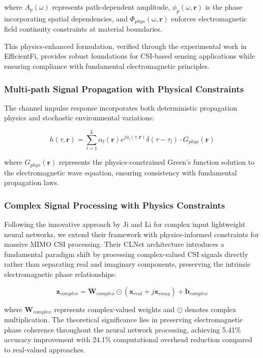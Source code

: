 \documentclass[journal]{IEEEtran}
\begin{document}
where $A_p(\omega)$ represents path-dependent amplitude, $\phi_p(\omega,\mathbf{r})$ is the phase incorporating spatial dependencies, and $\Phi_{phys}(\omega,\mathbf{r})$ enforces electromagnetic field continuity constraints at material boundaries.

This physics-enhanced formulation, verified through the experimental work in EfficientFi, provides robust foundations for CSI-based sensing applications while ensuring compliance with fundamental electromagnetic principles.

\subsubsection{Multi-path Signal Propagation with Physical Constraints}

The channel impulse response incorporates both deterministic propagation physics and stochastic environmental variations:

\begin{equation}
h(\tau,\mathbf{r}) = \sum_{l=1}^{L} \alpha_l(\mathbf{r}) e^{j\phi_l(\tau,\mathbf{r})} \delta(\tau - \tau_l) \cdot G_{phys}(\mathbf{r})
\label{eq:cir_physics}
\end{equation}

where $G_{phys}(\mathbf{r})$ represents the physics-constrained Green's function solution to the electromagnetic wave equation, ensuring consistency with fundamental propagation laws.

\subsubsection{Complex Signal Processing with Physics Constraints}

Following the innovative approach by Ji and Li \cite{ji2021clnet} for complex input lightweight neural networks, we extend their framework with physics-informed constraints for massive MIMO CSI processing. Their CLNet architecture introduces a fundamental paradigm shift by processing complex-valued CSI signals directly rather than separating real and imaginary components, preserving the intrinsic electromagnetic phase relationships:

\begin{equation}
\mathbf{z}_{complex} = \mathbf{W}_{complex} \odot (\mathbf{x}_{real} + j\mathbf{x}_{imag}) + \mathbf{b}_{complex}
\label{eq:clnet_complex}
\end{equation}

where $\mathbf{W}_{complex}$ represents complex-valued weights and $\odot$ denotes complex multiplication. The theoretical significance lies in preserving electromagnetic phase coherence throughout the neural network processing, achieving 5.41\% accuracy improvement with 24.1\% computational overhead reduction compared to real-valued approaches.
\end{document}
